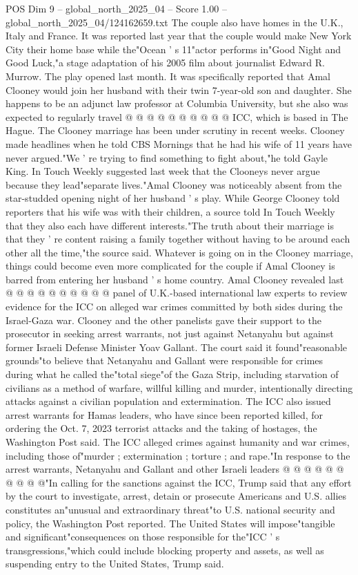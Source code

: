 \begin{textsample}{POS Dim 9 – global\_north\_2025\_04 – Score 1.00 – global\_north\_2025\_04/124162659.txt}
The couple also have homes in the U.K., Italy and France.
It was reported last year that the couple would make New York City their home base while the"Ocean ' s 11"actor performs in"Good Night and Good Luck,"a stage adaptation of his 2005 film about journalist Edward R.
Murrow.
The play opened last month.
It was specifically reported that Amal Clooney would join her husband with their twin 7-year-old son and daughter.
She happens to be an adjunct law professor at Columbia University, but she also was expected to regularly travel @ @ @ @ @ @ @ @ @ @ ICC, which is based in The Hague.
The Clooney marriage has been under scrutiny in recent weeks.
Clooney made headlines when he told CBS Mornings that he had his wife of 11 years have never argued."We ' re trying to find something to fight about,"he told Gayle King.
In Touch Weekly suggested last week that the Clooneys never argue because they lead"separate lives."Amal Clooney was noticeably absent from the star-studded opening night of her husband ' s play.
While George Clooney told reporters that his wife was with their children, a source told In Touch Weekly that they also each have different interests."The truth about their marriage is that they ' re content raising a family together without having to be around each other all the time,"the source said.
Whatever is going on in the Clooney marriage, things could become even more complicated for the couple if Amal Clooney is barred from entering her husband ' s home country.
Amal Clooney revealed last @ @ @ @ @ @ @ @ @ @ panel of U.K.-based international law experts to review evidence for the ICC on alleged war crimes committed by both sides during the Israel-Gaza war.
Clooney and the other panelists gave their support to the prosecutor in seeking arrest warrants, not just against Netanyahu but against former Israeli Defense Minister Yoav Gallant.
The court said it found"reasonable grounds"to believe that Netanyahu and Gallant were responsible for crimes during what he called the"total siege"of the Gaza Strip, including starvation of civilians as a method of warfare, willful killing and murder, intentionally directing attacks against a civilian population and extermination.
The ICC also issued arrest warrants for Hamas leaders, who have since been reported killed, for ordering the Oct. 7, 2023 terrorist attacks and the taking of hostages, the Washington Post said.
The ICC alleged crimes against humanity and war crimes, including those of"murder ; extermination ; torture ; and rape."In response to the arrest warrants, Netanyahu and Gallant and other Israeli leaders @ @ @ @ @ @ @ @ @ @"In calling for the sanctions against the ICC, Trump said that any effort by the court to investigate, arrest, detain or prosecute Americans and U.S. allies constitutes an"unusual and extraordinary threat"to U.S. national security and policy, the Washington Post reported.
The United States will impose"tangible and significant"consequences on those responsible for the"ICC ' s transgressions,"which could include blocking property and assets, as well as suspending entry to the United States, Trump said.

\end{textsample}
